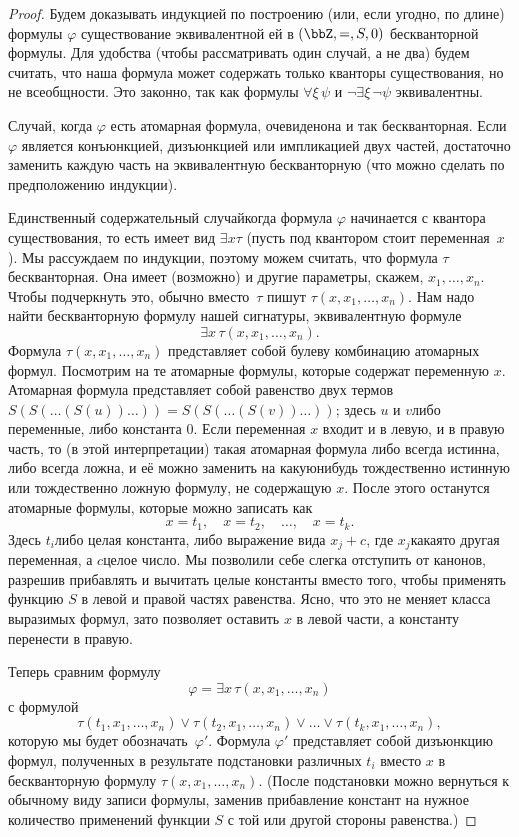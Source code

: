 \begin{proof}
Будем доказывать индукцией по построению (или, если угодно, по
длине) формулы $\varphi$ существование эквивалентной ей в
$(\bbZ,=,S,0)$
бескванторной формулы. Для удобства (чтобы рассматривать один
случай, а не два) будем считать, что наша формула может
содержать только кванторы существования, но не всеобщности. Это
законно, так как формулы $\forall \xi \,\psi$ и
$\lnot\exists\xi\,\lnot\psi$ эквивалентны.

Случай, когда $\varphi$ есть атомарная формула, очевиден\т она и
так бескванторная. Если $\varphi$ является конъюнкцией, дизъюнкцией
или импликацией двух частей, достаточно заменить каждую часть
на эквивалентную бескванторную (что можно сделать по
предположению индукции).

Единственный содержательный случай\т когда формула $\varphi$
начинается с квантора существования, то есть имеет вид $\exists
x \tau$ (пусть под квантором стоит переменная~$x$).
Мы рассуждаем по индукции, поэтому можем считать,
что формула $\tau$\т бескванторная.
Она имеет (возможно) и другие параметры, скажем,
$x_1,\dots,x_n$. Чтобы подчеркнуть это, обычно вместо~$\tau$
пишут $\tau(x,x_1,\dots,x_n)$. Нам надо найти бескванторную
формулу нашей сигнатуры, эквивалентную формуле
        $$
\exists x\, \tau(x,x_1,\dots,x_n).
        $$
Формула $\tau(x,x_1,\dots,x_n)$ представляет собой булеву
комбинацию атомарных формул. Посмотрим на те атомарные формулы,
которые содержат переменную $x$. Атомарная формула представляет
собой равенство двух термов
$S(S(\dots(S(u))\dots))=S(S(\dots(S(v))\dots))$; здесь $u$ и
$v$\т либо переменные, либо константа $0$. Если переменная $x$
входит и в левую, и в правую часть, то (в этой интерпретации)
такая атомарная формула либо всегда истинна, либо всегда ложна,
и её можно заменить на какую\д нибудь тождественно истинную или
тождественно ложную
формулу, не содержащую $x$. После этого останутся
атомарные формулы, которые можно записать как
        $$
x = t_1,\quad x = t_2,\quad\dots,\quad x = t_k.
        $$
Здесь $t_i$\т либо целая константа, либо выражение вида $x_j+c$,
где $x_j$\т какая\д то другая переменная, а $c$\т целое число.
Мы позволили себе слегка отступить от канонов, разрешив прибавлять
и вычитать целые константы вместо того, чтобы применять функцию $S$
в левой и правой частях равенства. Ясно, что это не меняет класса
выразимых формул, зато позволяет оставить $x$ в левой части, а
константу перенести в правую.

Теперь сравним формулу
        $$
\varphi=\exists x \,\tau(x,x_1,\dots,x_n)
        $$
с формулой
        $$
\tau(t_1,x_1,\dots,x_n) \lor
\tau(t_2,x_1,\dots,x_n) \lor \ldots
\lor \tau(t_k,x_1,\dots,x_n),
        $$
которую мы будет обозначать~$\varphi'$.
Формула $\varphi'$ представляет собой дизъюнкцию формул,
полученных в результате подстановки различных $t_i$ вместо $x$ в
бескванторную формулу $\tau(x,x_1,\dots,x_n)$. (После
подстановки можно вернуться к обычному виду записи формулы,
заменив прибавление констант на нужное количество применений
функции $S$ с той или другой стороны равенства.)


\end{proof}
